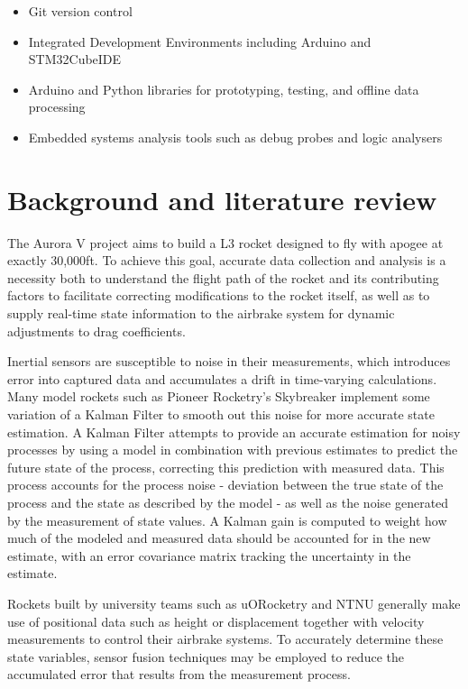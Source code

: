 \begin{itemize}
  \item Git version control
  \item Integrated Development Environments including Arduino and STM32CubeIDE
  \item Arduino and Python libraries for prototyping, testing, and offline data processing 
  \item Embedded systems analysis tools such as debug probes and logic analysers
\end{itemize}

\section{Background and literature review}
The Aurora V project aims to build a L3 rocket designed to fly with apogee at exactly 30,000ft. To achieve this goal, accurate data collection and analysis is a necessity both to understand the flight path of the rocket and its contributing factors to facilitate correcting modifications to the rocket itself, as well as to supply real-time state information to the airbrake system for dynamic adjustments to drag coefficients.

Inertial sensors are susceptible to noise in their measurements, which introduces error into captured data and accumulates a drift in time-varying calculations. Many model rockets such as Pioneer Rocketry's Skybreaker\cite{pioneer-rocketry} implement some variation of a Kalman Filter to smooth out this noise for more accurate state estimation. A Kalman Filter attempts to provide an accurate estimation for noisy processes by using a model in combination with previous estimates to predict the future state of the process, correcting this prediction with measured data\cite{kalman-introduction,kalman1960}. This process accounts for the process noise - deviation between the true state of the process and the state as described by the model - as well as the noise generated by the measurement of state values. A Kalman gain is computed to weight how much of the modeled and measured data should be accounted for in the new estimate, with an error covariance matrix tracking the uncertainty in the estimate.

Rockets built by university teams such as uORocketry and NTNU generally make use of positional data such as height or displacement together with velocity measurements to control their airbrake systems\cite{uORocketry, NTNU}. To accurately determine these state variables, sensor fusion techniques may be employed to reduce the accumulated error that results from the measurement process. 

